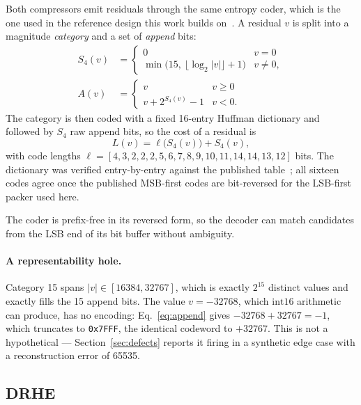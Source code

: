 \documentclass[10pt,twocolumn]{article}
\begin{document}
Both compressors emit residuals through the same entropy coder, which is the
one used in the reference design this work builds on~\cite{kiem2023}. A
residual $v$ is split into a magnitude \emph{category} and a set of
\emph{append} bits:
\begin{align}
S_4(v) &= \begin{cases} 0 & v = 0\\
\min\bigl(15,\ \lfloor \log_2 |v| \rfloor + 1\bigr) & v \neq 0,\end{cases}\\
\label{eq:append}
A(v) &= \begin{cases} v & v \geq 0\\ v + 2^{S_4(v)} - 1 & v < 0.\end{cases}
\end{align}
The category is then coded with a fixed 16-entry Huffman dictionary and
followed by $S_4$ raw append bits, so the cost of a residual is
\begin{equation}
\label{eq:cost}
L(v) = \ell\bigl(S_4(v)\bigr) + S_4(v),
\end{equation}
with code lengths
$\ell = [4,3,2,2,2,5,6,7,8,9,10,11,14,14,13,12]$ bits.
The dictionary was verified entry-by-entry against the published
table~\cite[Table~A.1]{kiem2023}; all sixteen codes agree once the published
MSB-first codes are bit-reversed for the LSB-first packer used here.

The coder is prefix-free in its reversed form, so the decoder can match
candidates from the LSB end of its bit buffer without ambiguity.

\paragraph{A representability hole.}
Category 15 spans $|v| \in [16384, 32767]$, which is exactly $2^{15}$ distinct
values and exactly fills the 15 append bits. The value $v=-32768$, which
$\mathrm{int}16$ arithmetic can produce, has no encoding:
Eq.~\eqref{eq:append} gives $-32768 + 32767 = -1$, which truncates to
\texttt{0x7FFF}, the identical codeword to $+32767$. This is not a hypothetical
--- Section~\ref{sec:defects} reports it firing in a synthetic edge case with a
reconstruction error of \num{65535}.

\subsection{DRHE}
\label{sec:drhe}
\end{document}

